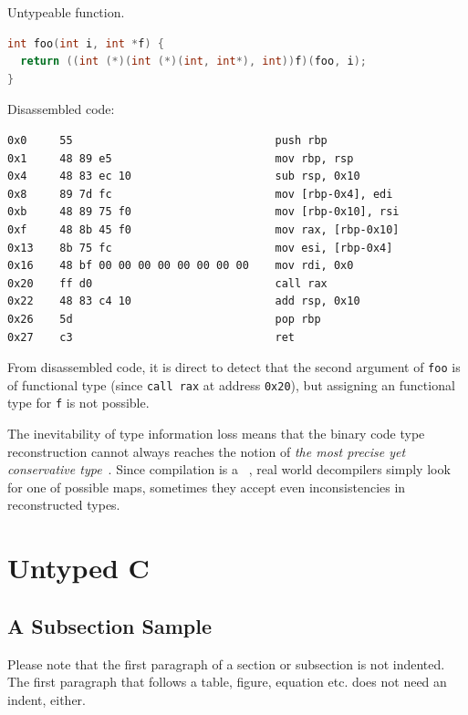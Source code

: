 \documentclass[a4paper]{llncs}
\begin{document}
\begin{example}\label{exa:untypeable}
Untypeable function.
\begin{lstlisting}[frame=topline, language={C}]
int foo(int i, int *f) {
  return ((int (*)(int (*)(int, int*), int))f)(foo, i);
}
\end{lstlisting}
Disassembled code:
\begin{lstlisting}[frame=bottomline, language={[x86masm]Assembler}]
0x0     55                               push rbp
0x1     48 89 e5                         mov rbp, rsp
0x4     48 83 ec 10                      sub rsp, 0x10
0x8     89 7d fc                         mov [rbp-0x4], edi
0xb     48 89 75 f0                      mov [rbp-0x10], rsi
0xf     48 8b 45 f0                      mov rax, [rbp-0x10]
0x13    8b 75 fc                         mov esi, [rbp-0x4]
0x16    48 bf 00 00 00 00 00 00 00 00    mov rdi, 0x0
0x20    ff d0                            call rax
0x22    48 83 c4 10                      add rsp, 0x10
0x26    5d                               pop rbp
0x27    c3                               ret
\end{lstlisting}

From disassembled code, it is direct to detect that the second argument
of \texttt{foo} is of functional type (since \texttt{call rax} at address \texttt{0x20}),
but assigning an functional type for \texttt{f} is not possible.
\end{example}

The inevitability of type information loss means that the binary code
type reconstruction cannot always reaches the notion of
\emph{the most precise yet conservative type}~\cite{lee_tie_2011}. Since
compilation is a ~\cite{mycroft_type-based_1999},
real world decompilers simply look for one of possible maps,
sometimes they accept even inconsistencies in reconstructed types.

\section{Untyped C}




\subsection{A Subsection Sample}
Please note that the first paragraph of a section or subsection is
not indented. The first paragraph that follows a table, figure,
equation etc. does not need an indent, either.
\end{document}
